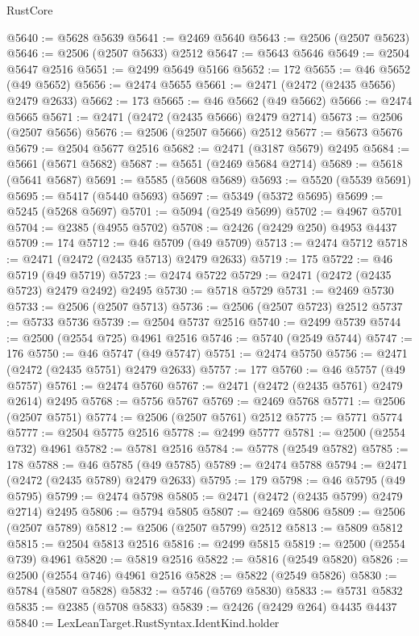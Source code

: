 \begin{lexlean}{RustCore}
\begin{coremodule}
@5640 := @5628 @5639
@5641 := @2469 @5640
@5643 := @2506 (@2507 @5623)
@5646 := @2506 (@2507 @5633) @2512
@5647 := @5643 @5646
@5649 := @2504 @5647 @2516
@5651 := @2499 @5649 @5166
@5652 := 172
@5655 := @46 @5652 (@49 @5652)
@5656 := @2474 @5655
@5661 := @2471 (@2472 (@2435 @5656) @2479 @2633)
@5662 := 173
@5665 := @46 @5662 (@49 @5662)
@5666 := @2474 @5665
@5671 := @2471 (@2472 (@2435 @5666) @2479 @2714)
@5673 := @2506 (@2507 @5656)
@5676 := @2506 (@2507 @5666) @2512
@5677 := @5673 @5676
@5679 := @2504 @5677 @2516
@5682 := @2471 (@3187 @5679) @2495
@5684 := @5661 (@5671 @5682)
@5687 := @5651 (@2469 @5684 @2714)
@5689 := @5618 (@5641 @5687)
@5691 := @5585 (@5608 @5689)
@5693 := @5520 (@5539 @5691)
@5695 := @5417 (@5440 @5693)
@5697 := @5349 (@5372 @5695)
@5699 := @5245 (@5268 @5697)
@5701 := @5094 (@2549 @5699)
@5702 := @4967 @5701
@5704 := @2385 (@4955 @5702)
@5708 := @2426 (@2429 @250) @4953 @4437
@5709 := 174
@5712 := @46 @5709 (@49 @5709)
@5713 := @2474 @5712
@5718 := @2471 (@2472 (@2435 @5713) @2479 @2633)
@5719 := 175
@5722 := @46 @5719 (@49 @5719)
@5723 := @2474 @5722
@5729 := @2471 (@2472 (@2435 @5723) @2479 @2492) @2495
@5730 := @5718 @5729
@5731 := @2469 @5730
@5733 := @2506 (@2507 @5713)
@5736 := @2506 (@2507 @5723) @2512
@5737 := @5733 @5736
@5739 := @2504 @5737 @2516
@5740 := @2499 @5739
@5744 := @2500 (@2554 @725) @4961 @2516
@5746 := @5740 (@2549 @5744)
@5747 := 176
@5750 := @46 @5747 (@49 @5747)
@5751 := @2474 @5750
@5756 := @2471 (@2472 (@2435 @5751) @2479 @2633)
@5757 := 177
@5760 := @46 @5757 (@49 @5757)
@5761 := @2474 @5760
@5767 := @2471 (@2472 (@2435 @5761) @2479 @2614) @2495
@5768 := @5756 @5767
@5769 := @2469 @5768
@5771 := @2506 (@2507 @5751)
@5774 := @2506 (@2507 @5761) @2512
@5775 := @5771 @5774
@5777 := @2504 @5775 @2516
@5778 := @2499 @5777
@5781 := @2500 (@2554 @732) @4961
@5782 := @5781 @2516
@5784 := @5778 (@2549 @5782)
@5785 := 178
@5788 := @46 @5785 (@49 @5785)
@5789 := @2474 @5788
@5794 := @2471 (@2472 (@2435 @5789) @2479 @2633)
@5795 := 179
@5798 := @46 @5795 (@49 @5795)
@5799 := @2474 @5798
@5805 := @2471 (@2472 (@2435 @5799) @2479 @2714) @2495
@5806 := @5794 @5805
@5807 := @2469 @5806
@5809 := @2506 (@2507 @5789)
@5812 := @2506 (@2507 @5799) @2512
@5813 := @5809 @5812
@5815 := @2504 @5813 @2516
@5816 := @2499 @5815
@5819 := @2500 (@2554 @739) @4961
@5820 := @5819 @2516
@5822 := @5816 (@2549 @5820)
@5826 := @2500 (@2554 @746) @4961 @2516
@5828 := @5822 (@2549 @5826)
@5830 := @5784 (@5807 @5828)
@5832 := @5746 (@5769 @5830)
@5833 := @5731 @5832
@5835 := @2385 (@5708 @5833)
@5839 := @2426 (@2429 @264) @4435 @4437
@5840 := LexLeanTarget.RustSyntax.IdentKind.holder

\end{coremodule}
\end{lexlean}
